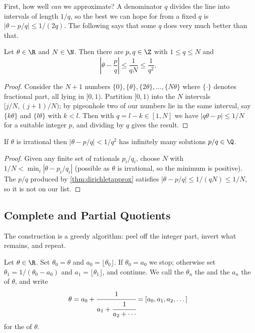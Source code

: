 First, how well \emph{can} we approximate? A denominator $q$ divides the line into intervals of length $1/q$, so the best we can hope for from a fixed $q$ is $|\theta - p/q| \leq 1/(2q)$. The following says that some $q$ does very much better than that.

\begin{theorem}[Dirichlet]\label{thm:dirichletapprox}
	Let $\theta \in \R$ and $N \in \N$. Then there are $p, q \in \Z$ with $1 \leq q \leq N$ and
	$$
	\left|\theta - \frac pq\right| \leq \frac1{qN} \leq \frac1{q^2}.
	$$
\end{theorem}
\begin{proof}
	Consider the $N+1$ numbers $\{0\}, \{\theta\}, \{2\theta\}, \dots, \{N\theta\}$ where $\{\cdot\}$ denotes fractional part, all lying in $[0,1)$. Partition $[0,1)$ into the $N$ intervals $[j/N, (j+1)/N)$; by pigeonhole two of our numbers lie in the same interval, say $\{k\theta\}$ and $\{l\theta\}$ with $k < l$. Then with $q = l - k \in [1, N]$ we have $|q\theta - p| \leq 1/N$ for a suitable integer $p$, and dividing by $q$ gives the result.
\end{proof}

\begin{corollary}
	If $\theta$ is irrational then $|\theta - p/q| < 1/q^2$ has infinitely many solutions $p/q \in \Q$.
\end{corollary}
\begin{proof}
	Given any finite set of rationals $p_i/q_i$, choose $N$ with $1/N < \min_i|\theta - p_i/q_i|$ (possible as $\theta$ is irrational, so the minimum is positive). The $p/q$ produced by \autoref{thm:dirichletapprox} satisfies $|\theta - p/q| \leq 1/(qN) \leq 1/N$, so it is not on our list.
\end{proof}

\subsection{Complete and Partial Quotients}

The construction is a greedy algorithm: peel off the integer part, invert what remains, and repeat.

\begin{definition}
	Let $\theta \in \R$. Set $\theta_0 = \theta$ and $a_0 = \lfloor \theta_0 \rfloor$. If $\theta_0 = a_0$ we stop; otherwise set $\theta_1 = 1/(\theta_0 - a_0)$ and $a_1 = \lfloor\theta_1\rfloor$, and continue. We call the $\theta_n$ the  and the $a_n$ the  of $\theta$, and write
	$$
	\theta = a_0 + \cfrac1{a_1 + \cfrac1{a_2 + \cdots}} = [a_0, a_1, a_2, \dots]
	$$
	for the  of $\theta$.
\end{definition}


